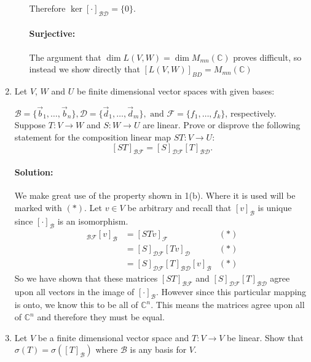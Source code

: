 \documentclass{article}
\begin{document}
\begin{enumerate}
\begin{enumerate}
      Therefore $\ker[\cdot ]_{\mathcal{BD}}=\{0\} $.
      \paragraph{Surjective:} The argument that $\dim L(V,W)=\dim M_{mn}(\mathbb{C})$ proves difficult, so instead we show directly that $[L(V,W)]_{BD}=M_{mn}(\mathbb{C})$
      \end{enumerate}
    \item Let $V$, $W$ and $U$ be finite dimensional vector spaces with given bases: 

        $\mathcal{B} = \{\vec{b}_1,\ldots,\vec{b}_n\}, \mathcal{D} = \{\vec{d}_1,\ldots,\vec{d}_m\}, \text{ and } \mathcal{F} = \{f_1,\ldots,f_k\}$, respectively. Suppose $T : V \to W$ and $S : W \to U$ are linear. Prove or disprove the following statement for the composition linear map  $ST : V \to U$:
      \[
      [ST]_{\mathcal{B}\mathcal{F}}=[S]_{\mathcal{DF}}[T]_{\mathcal{B}\mathcal{D}}
      .\] 

      \paragraph{Solution: }%
      We make great use of the property shown in 1(b). Where it is used will be marked with $(*)$. Let $v\in V$ be arbitrary and recall that $[v]_{\mathcal{B}}$ is unique since $[\cdot ]_\mathcal{B}$ is an isomorphism. 
      \begin{align*}
          [ST]_{\mathcal{B}\mathcal{F}}[v]_\mathcal{B}&= [STv]_\mathcal{F}&(*) \\
                                              &= [S]_{\mathcal{D}\mathcal{F}}[Tv]_{\mathcal{D}}&(*) \\
                                              &= [S]_{\mathcal{D}\mathcal{F}}[T]_{\mathcal{B}\mathcal{D}}[v]_\mathcal{B}&(*) 
      \end{align*}
      So we have shown that these matrices $[ST]_{\mathcal{B}\mathcal{F}}$ and  $[S]_{\mathcal{DF}}[T]_{\mathcal{B}\mathcal{D}} $ agree upon all vectors in the image of $[\cdot ]_\mathcal{B}$. However since this particular mapping is onto, we know this to be all of  $\mathbb{C}^{n}$. This means the matrices agree upon all of $\mathbb{C}^{n}$ and therefore they must be equal. 
  \item Let $V$ be a finite dimensional vector space and $T : V \to V$ be linear. Show that $\sigma(T)=\sigma([T]_{\mathcal{B}})$ where $\mathcal{B}$ is any basis for $V$.

\end{enumerate}
\end{document}
